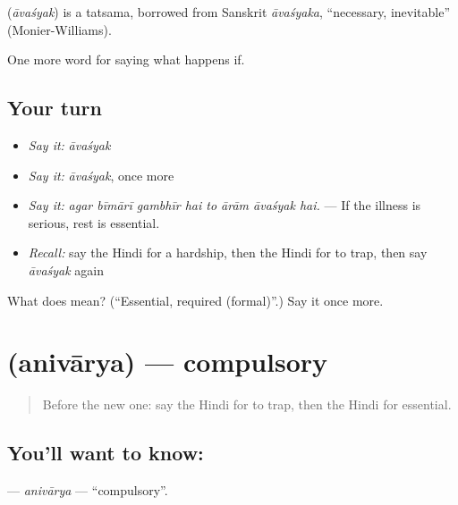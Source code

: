 \begin{cousinweb}
\textbf{} (\emph{āvaśyak}) is a tatsama, borrowed from Sanskrit \emph{āvaśyaka}, \textquotedblleft{}necessary, inevitable\textquotedblright{} (Monier-Williams).
\end{cousinweb}

\begin{grammarlens}[title={What you've built}]
One more word for saying what happens if.
\end{grammarlens}

\subsection*{Your turn}
\begin{itemize}
\raggedright
  \item \emph{Say it:} \emph{āvaśyak}
  \item \emph{Say it:} \emph{āvaśyak}, once more
  \item \emph{Say it:} \emph{agar bīmārī gambhīr hai to ārām āvaśyak hai.} — If the illness is serious, rest is essential.
  \item \emph{Recall:} say the Hindi for a hardship, then the Hindi for to trap, then say \emph{āvaśyak} again
\end{itemize}

\begin{tcolorbox}[breakable,colback=teal!4,colframe=teal!35!black,title={Before you move on}]
What does  mean? (\textquotedblleft{}Essential, required (formal)\textquotedblright{}.) Say it once more.
\end{tcolorbox}
\section[\texorpdfstring{\hi{अनिवार्य} (anivārya)}{अनिवार्य (anivārya)}]{ (anivārya) — compulsory}

\label{lesson:HI-C378-anivarya}



\begin{quote}
Before the new one: say the Hindi for to trap, then the Hindi for essential.
\end{quote}

\subsection*{You'll want to know: }
\textbf{} — \emph{anivārya} — \textquotedblleft{}compulsory\textquotedblright{}.


